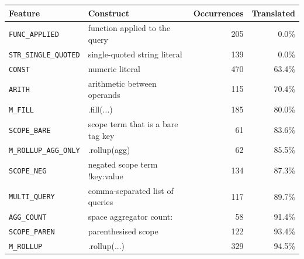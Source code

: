 \begin{tabular}{@{}llrr@{}}
\toprule
Feature & Construct & Occurrences & Translated \\
\midrule
\texttt{FUNC\_APPLIED} & function applied to the query & 205 & 0.0\% \\
\texttt{STR\_SINGLE\_QUOTED} & single-quoted string literal & 139 & 0.0\% \\
\texttt{CONST} & numeric literal & 470 & 63.4\% \\
\texttt{ARITH} & arithmetic between operands & 115 & 70.4\% \\
\texttt{M\_FILL} & .fill(...) & 185 & 80.0\% \\
\texttt{SCOPE\_BARE} & scope term that is a bare tag key & 61 & 83.6\% \\
\texttt{M\_ROLLUP\_AGG\_ONLY} & .rollup(agg) & 62 & 85.5\% \\
\texttt{SCOPE\_NEG} & negated scope term !key:value & 134 & 87.3\% \\
\texttt{MULTI\_QUERY} & comma-separated list of queries & 117 & 89.7\% \\
\texttt{AGG\_COUNT} & space aggregator count: & 58 & 91.4\% \\
\texttt{SCOPE\_PAREN} & parenthesised scope & 122 & 93.4\% \\
\texttt{M\_ROLLUP} & .rollup(...) & 329 & 94.5\% \\
\bottomrule
\end{tabular}
